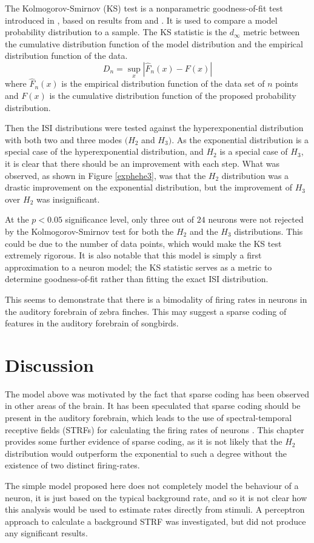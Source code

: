 The Kolmogorov-Smirnov (KS) test is a nonparametric goodness-of-fit test introduced in \citep{Massey1951a}, based on results from \citet{Kolmogorov1933a} and \citet{Smirnoff1939a}.  It is used to compare a model probability distribution to a sample.  The KS statistic is the $d_{\infty}$ metric between the cumulative distribution function of the model distribution and the empirical distribution function of the data.
\begin{equation}
D_n = \sup_x \left| \hat{F}_n(x) - F(x) \right|
\end{equation}
where $\hat{F}_n(x)$ is the empirical distribution function of the data set of $n$ points and $F(x)$ is the cumulative distribution function of the proposed probability distribution.

Then the ISI distributions were tested against the hyperexponential distribution with both two and three modes $(H_2$ and $H_3)$.  As the exponential distribution is a special case of the hyperexponential distribution, and $H_2$ is a special case of $H_3$, it is clear that there should be an improvement with each step.  What was observed, as shown in Figure \ref{exphehe3}, was that the $H_2$ distribution was a drastic improvement on the exponential distribution, but the improvement of $H_3$ over $H_2$ was insignificant. 

At the $p<0.05$ significance level, only three out of $24$ neurons were not rejected by the Kolmogorov-Smirnov test for both the $H_2$ and the $H_3$ distributions. This could be due to the number of data points, which would make the KS test extremely rigorous.  It is also notable that this model is simply a first approximation to a neuron model; the KS statistic serves as a metric to determine goodness-of-fit rather than fitting the exact ISI distribution.

This seems to demonstrate that there is a bimodality of firing rates in neurons in the auditory forebrain of zebra finches.  This may suggest a sparse coding of features in the auditory forebrain of songbirds.  

\section{Discussion}
The model above was motivated by the fact that sparse coding has been observed in other areas of the brain.  It has been speculated that sparse coding should be present in the auditory forebrain, which leads to the use of spectral-temporal receptive fields (STRFs) for calculating the firing rates of neurons \citep{TheunissenEtAl2000a}.  This chapter provides some further evidence of sparse coding, as it is not likely that the $H_2$ distribution would outperform the exponential to such a degree without the existence of two distinct firing-rates.

The simple model proposed here does not completely model the behaviour of a neuron, it is just based on the typical background rate, and so it is not clear how this analysis would be used to estimate rates directly from stimuli.  A perceptron approach to calculate a background STRF was investigated, but did not produce any significant results.




